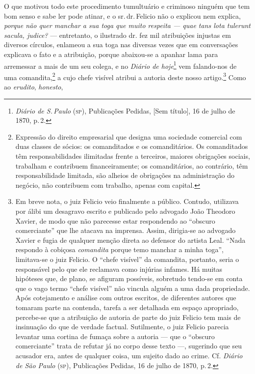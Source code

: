 O que motivou todo este procedimento tumultuário e criminoso ninguém que
tem bom senso e sabe ler pode atinar, e o sr.\,dr.\,Felicio não o explicou
nem explica, \emph{porque não quer manchar a sua toga que muito respeita
--- quae tans lota tulerunt sacula, judice?} --- entretanto, o ilustrado
dr. fez mil atribuições injustas em diversos círculos, enlameou a sua
toga nas diversas vezes que em conversações explicava o fato e a
atribuição, porque abaixou-se a apanhar lama para arremessar a mais de
um seu colega, e no \emph{Diário de hoje}\footnote{ \emph{Diário de S.\,Paulo} (\textsc{sp}), Publicações Pedidas, {[}Sem título{]}, 16 de julho de 1870, p.\,2.}
vem falando-nos de uma comandita,\footnote{ Expressão do direito
  empresarial que designa uma sociedade comercial com duas classes de
  sócios: os comanditados e os comanditários. Os comanditados têm
  responsabilidades ilimitadas frente a terceiros, maiores obrigações
  sociais, trabalham e contribuem financeiramente; os comanditários, ao
  contrário, têm responsabilidade limitada, são alheios de obrigações na
  administração do negócio, não contribuem com trabalho, apenas com
  capital.} a cujo chefe visível atribui a autoria deste nosso
artigo.\footnote{ Em breve nota, o juiz Felicio veio finalmente a
  público. Contudo, utilizava por álibi um desagravo escrito e publicado
  pelo advogado João Theodoro Xavier, de modo que não parecesse estar
  respondendo ao ``obscuro comerciante'' que lhe atacava na imprensa.
  Assim, dirigia-se ao advogado Xavier e fugia de qualquer menção direta
  ao defensor do artista Leal. ``Nada respondo à cobiçosa
  \emph{comandita} porque temo manchar a minha toga'', limitava-se o juiz
  Felicio. O ``chefe visível'' da comandita, portanto, seria o responsável
  pelo que ele reclamava como injúrias infames. Há muitas hipóteses que,
  de plano, se afiguram possíveis, sobretudo tendo-se em conta que o
  vago termo ``chefe visível'' não vincula alguém a uma dada propriedade.
  Após cotejamento e análise com outros escritos, de diferentes autores
  que tomaram parte na contenda, tarefa a ser detalhada em espaço
  apropriado, percebe-se que a atribuição de autoria de parte do juiz
  Felicio tem mais de insinuação do que de verdade factual. Sutilmente,
  o juiz Felicio parecia levantar uma cortina de fumaça sobre a autoria
  --- que o ``obscuro comerciante'' trata de refutar já no corpo desse
  texto ---, sugerindo que seu acusador era, antes de qualquer coisa, um
  sujeito dado ao crime. Cf. \emph{Diário de São Paulo} (\textsc{sp}), Publicações
  Pedidas, 16 de julho de 1870, p.\,2.} Como ao \emph{erudito}, \emph{honesto},
